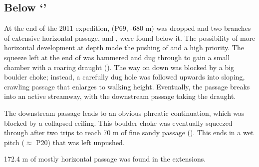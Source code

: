 \subsection{Below `'}

At the end of the 2011 expedition,  (P69, -680
m) was dropped and two branches of extensive horizontal passage,
 and , were found below it. The
possibility of more horizontal development at depth made the pushing of
 and  a high priority. 
The squeeze left at the end of  was hammered and dug
through to gain a small chamber with a roaring draught (). The way on down was blocked by a big boulder choke; instead, a
carefully dug hole was followed upwards into sloping, crawling passage
that enlarges to walking height. Eventually, the passage breaks into an
active streamway, with the downstream passage taking the draught.

The downstream passage leads to an obvious phreatic continuation, which
was blocked by a collapsed ceiling. This boulder choke was eventually
squeezed through after two trips to reach 70 m of fine sandy passage
(). This ends in a wet pitch ($\approx$ P20) that
was left unpushed.

172.4 m of mostly horizontal passage was found in the 
extensions.


\subsection{}

